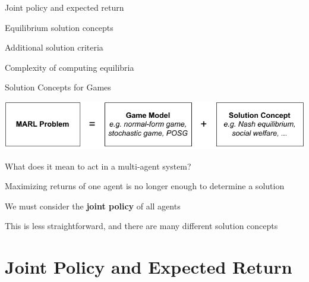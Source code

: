 

\leoslide

\subtitle{Solution Concepts for Games}


\maketitle

\introslide

\begin{frame}{\outline}

\blist
    \item Joint policy and expected return
    \item Equilibrium solution concepts
    \item Additional solution criteria 
    \item Complexity of computing equilibria
\elist
    
\end{frame}

\begin{frame}{Solution Concepts for Games}
	\begin{center}
        \includegraphics{images/chapter_4/marl-learning-problem.pdf}
   	\end{center}
    	
    What does it mean to act  in a multi-agent system?

    \blist
        \item Maximizing returns of one agent is no longer enough to determine a solution
        \item We must consider the {\bf joint policy} of all agents
        \item This is less straightforward, and there are many different solution concepts
    \elist
    
\end{frame}

\section{Joint Policy and Expected Return}

